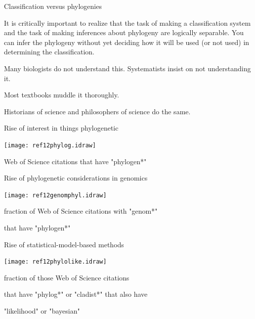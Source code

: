 \documentclass[pdf,bluish,slideColor,colorBG]{prosper}
\begin{document}
\begin{slide}[Replace]{Classification versus phylogenies}

It is critically important to realize that the task of making a classification
system and the task of making inferences about phylogeny are logically
separable.  You can infer the phylogeny without yet deciding how it will
be used (or not used) in determining the classification.
\medskip

Many biologists do not understand this.  Systematists insist on not
understanding it.
\medskip

Most textbooks muddle it thoroughly.
\medskip

Historians of science and philosophers of science do the same.
\medskip

\end{slide}

\begin{slide}[Replace]{Rise of interest in things phylogenetic}
\bigskip

\centerline{\texttt{[image: ref12phylog.idraw]}}
\bigskip

\centerline{Web of Science citations that have "phylogen*"}

\end{slide}

\begin{slide}[Replace]{Rise of phylogenetic considerations in genomics}
\bigskip

\centerline{\texttt{[image: ref12genomphyl.idraw]}}
\bigskip

\centerline{fraction of Web of Science citations with "genom*"}
\centerline{that have "phylogen*"}

\end{slide}

\begin{slide}[Replace]{Rise of statistical-model-based methods }
\bigskip

\centerline{\texttt{[image: ref12phylolike.idraw]}}
\bigskip

\centerline{fraction of those Web of Science citations}
\centerline{that have "phylog*" or "cladist*" that also have}
\centerline{"likelihood" or "bayesian"}

\end{slide}
\end{document}
